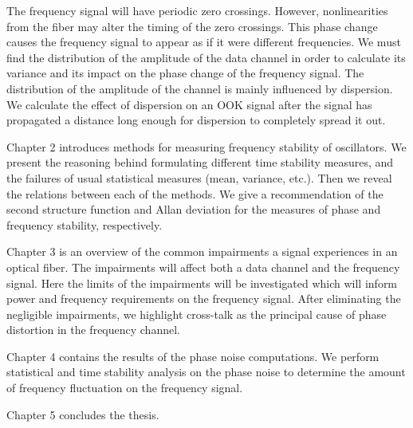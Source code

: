 The frequency signal will have periodic zero crossings.  However, nonlinearities from the fiber may alter the timing of the zero crossings.  This phase change causes the frequency signal to appear as if it were different frequencies.  We must find the distribution of the amplitude of the data channel in order to calculate its variance and its impact on the phase change of the frequency signal.  The distribution of the amplitude of the channel is mainly influenced by dispersion.  We calculate the effect of dispersion on an OOK signal after the signal has propagated a distance long enough for dispersion to completely spread it out.


Chapter 2 introduces methods for measuring frequency stability of oscillators. We present the reasoning behind formulating different time stability measures, and the failures of usual statistical measures (mean, variance, etc.). Then we reveal the relations between each of the methods. We give a recommendation of the second structure function and Allan deviation for the measures of phase and frequency stability, respectively.

Chapter 3 is an overview of the common impairments a signal experiences in an optical fiber.  The impairments will affect both a data channel and the frequency signal. Here the limits of the impairments will be investigated which will inform power and frequency requirements on the frequency signal. After eliminating the negligible impairments, we highlight cross-talk as the principal cause of phase distortion in the frequency channel.

Chapter 4 contains the results of the phase noise computations.  We perform statistical and time stability analysis on the phase noise to determine the amount of frequency fluctuation on the frequency signal.

Chapter 5 concludes the thesis.



